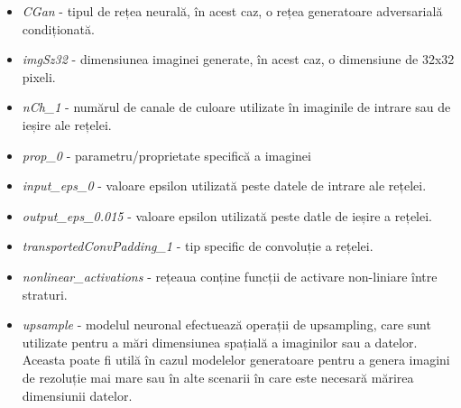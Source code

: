 \begin{itemize}
  \item \textit{CGan} - tipul de rețea neurală, în acest caz, o rețea generatoare adversarială condiționată.
  
  \item \textit{imgSz32} - dimensiunea imaginei generate, în acest caz, o dimensiune de 32x32 pixeli.

  \item \textit{nCh\_1} - numărul de canale de culoare utilizate în imaginile de intrare sau de ieșire ale rețelei.
  
  \item \textit{prop\_0} - parametru/proprietate specifică a imaginei

  \item \textit{input\_eps\_0} - valoare epsilon utilizată peste datele de intrare ale rețelei.
  
  \item \textit{output\_eps\_0.015} -  valoare epsilon utilizată peste datle de ieșire a rețelei.


  \item \textit{transportedConvPadding\_1} - tip specific de convoluție a rețelei.
  
  \item \textit{nonlinear\_activations} - rețeaua conține funcții de activare non-liniare între straturi.

  \item \textit{upsample} - modelul neuronal efectuează operații de upsampling, care sunt utilizate pentru a mări dimensiunea spațială a imaginilor sau a datelor. Aceasta poate fi utilă în cazul modelelor generatoare pentru a genera imagini de rezoluție mai mare sau în alte scenarii în care este necesară mărirea dimensiunii datelor.
  
\end{itemize}